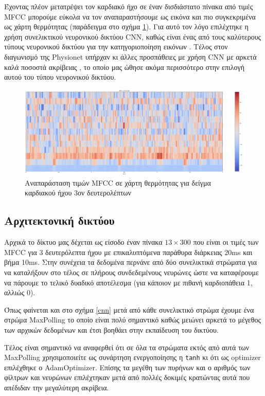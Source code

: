 \documentclass[../main.tex]{subfiles}
\begin{document}
Έχοντας πλέον μετατρέψει τον καρδιακό ήχο σε έναν δισδιάστατο πίνακα από τιμές
MFCC μπορούμε εύκολα να τον αναπαραστήσουμε ως εικόνα και πιο συγκεκριμένα ως
χάρτη θερμότητας (παράδειγμα στο σχήμα \ref{a0001_mfcc}). Για αυτό τον λόγο
επιλέχτηκε η χρήση συνελικτικού νευρονικού δικτύου CNN, καθώς είναι ένας από
τους καλύτερους τύπους νευρονικού δικτύου για την κατηγοριοποίηση εικόνων
\cite{ramprasath2018image}. Τέλος στον διαγωνισμό της Physionet \cite{physionet}
υπήρχαν κι άλλες προσπάθειες με χρήση CNN με αρκετά καλά ποσοστά ακρίβειας
\cite{jrubin}, το οποίο μας ώθησε ακόμα περισσότερο στην επιλογή αυτού του τύπου
νευρονικού δικτύου.

\begin{figure}[H]
	\includegraphics[width=\textwidth]{../images/a0001_mfcc.png}
	\caption{Αναπαράσταση τιμών MFCC σε χάρτη θερμότητας για δείγμα καρδιακού ήχου
		3ον δευτερολέπτων}
	\label{a0001_mfcc}
\end{figure}

\subsection{Αρχιτεκτονική δικτύου}

Αρχικά το δίκτυο μας δέχεται ως είσοδο έναν πίνακα $13\times300$ που είναι οι
τιμές των MFCC για 3 δευτερόλεπτα ήχου με επικαλυπτόμενα παράθυρα διάρκειας 20ms
και βήμα 10ms. Στην συνέχεια τα δεδομένα περνάνε από δύο συνελικτικά στρώματα
για να καταλήξουν στο τέλος σε πλήρους συνδεδεμένους νευρώνες ώστε να
καταφέρουμε να πάρουμε το τελικό δυαδικό αποτέλεσμα (για κάποιον με πιθανή
καρδιοπάθεια 1, αλλιώς 0).

Όπως φαίνεται και στο σχήμα \ref{cnn} μετά από κάθε συνελικτικό στρώμα έχουμε
ένα στρώμα MaxPolling το οποίο είναι πολύ σημαντικό καθώς μειώνει αρκετά το
μέγεθος των αρχικών δεδομένων και έτσι βοηθάει στην εκπαίδευση του δικτύου.

Τέλος είναι σημαντικό να αναφερθεί ότι σε όλα τα στρώματα εκτός από αυτά των
MaxPolling χρησιμοποιείτε ως συνάρτηση ενεργοποίησης η \verb|tanh| κι ότι ως
optimizer επιλέχθηκε ο AdamOptimizer. Επίσης τα μεγέθη των πυρήνων και ο αριθμός
των φίλτρων και νευρώνων επιλέχτηκαν μετά από πολλές δοκιμές κρατώντας αυτά που
απέδιδαν την μεγαλύτερη ακρίβεια.
\end{document}
